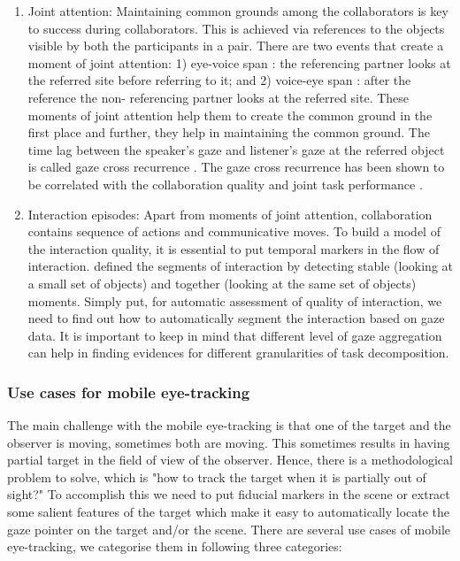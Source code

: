 \documentclass{sig-alternate}
\begin{document}
\begin{enumerate}

\item Joint attention: Maintaining common grounds among the collaborators is key to success during collaborators. This is achieved via references to the objects visible by both the participants in a pair. There are two events that create a moment of joint attention: 1) eye-voice span \cite{griffin2000eyes}: the referencing partner looks at the referred site before referring to it; and 2) voice-eye span \cite{allopenna1998tracking}: after the reference the non- referencing partner looks at the referred site. These moments of joint attention help them to create the common ground in the first place and further, they help in maintaining the common ground. The time lag between the speaker's gaze and listener's gaze at the referred object is called gaze cross recurrence \cite{richardson2007art}. The gaze cross recurrence has been shown to be correlated with the collaboration quality and joint task performance \cite{nussli2011dual}.


\item Interaction episodes: Apart from moments of joint attention, collaboration contains sequence of actions and communicative moves. To build a model of the interaction quality, it is essential to put temporal markers in the flow of interaction. \cite{sharma2012gaze} defined the segments of interaction by detecting stable (looking at a small set of objects) and together (looking at the same set of objects) moments. Simply put,
for automatic assessment of quality of interaction, we need to find out how to automatically segment the interaction based on gaze data. It is important to keep in mind that different level of gaze aggregation can help in finding evidences for different granularities of task decomposition.
\end{enumerate}


\subsubsection{Use cases for mobile eye-tracking} 

The main challenge with the mobile eye-tracking is that one of the target and the observer is moving, sometimes both are moving. This sometimes results in having partial target in the field of view of the observer. Hence, there is a methodological problem to solve, which is "how to track the target when it is partially out of sight?" To accomplish this we need to put fiducial markers in the scene or extract some salient features of the target which make it easy to automatically locate the gaze pointer on the target and/or the scene. There are several use cases of mobile eye-tracking, we categorise them in following three categories:
\end{document}
